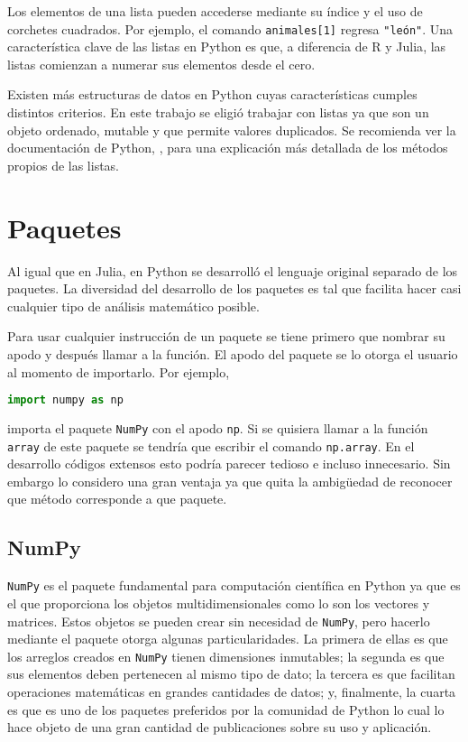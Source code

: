 Los elementos de una lista pueden accederse mediante su índice y el uso de corchetes cuadrados. Por ejemplo, el comando \texttt{animales[1]} regresa \texttt{"león"}. Una característica clave de las listas en \textsf{Python} es que, a diferencia de \textsf{R} y \textsf{Julia}, las listas comienzan a numerar sus elementos desde el cero. 

Existen más estructuras de datos en \textsf{Python} cuyas características cumples distintos criterios. En este trabajo se eligió trabajar con listas ya que son un objeto ordenado, mutable y que permite valores duplicados. Se recomienda ver la documentación de \textsf{Python}, \cite{doc_python}, para una explicación más detallada de los métodos propios de las listas. 

\section{Paquetes}
Al igual que en \textsf{Julia}, en \textsf{Python} se desarrolló el lenguaje original separado de los paquetes. La diversidad del desarrollo de los paquetes es tal que facilita hacer casi cualquier tipo de análisis matemático posible. 

Para usar cualquier instrucción de un paquete se tiene primero que nombrar su apodo y después llamar a la función. El apodo del paquete se lo otorga el usuario al momento de importarlo. Por ejemplo, 
\begin{lstlisting}[language=Python]
	import numpy as np
\end{lstlisting}

\noindent importa el paquete \texttt{NumPy} con el apodo \texttt{np}. Si se quisiera llamar a la función \texttt{array} de este paquete se tendría que escribir el comando \texttt{np.array}. En el desarrollo códigos extensos esto podría parecer tedioso e incluso innecesario. Sin embargo lo considero una gran ventaja ya que quita la ambigüedad de reconocer que método corresponde a que paquete.

\subsection{NumPy} \label{seccion_numpy}
\texttt{NumPy} es el paquete fundamental para computación científica en \textsf{Python} ya que es el que proporciona los objetos multidimensionales como lo son los vectores y matrices. Estos objetos se pueden crear sin necesidad de \texttt{NumPy}, pero hacerlo mediante el paquete otorga algunas particularidades. La primera de ellas es que los arreglos creados en \texttt{NumPy} tienen dimensiones inmutables; la segunda es que sus elementos deben pertenecen al mismo tipo de dato; la tercera es que facilitan operaciones matemáticas en grandes cantidades de datos; y, finalmente, la cuarta es que es uno de los paquetes preferidos por la comunidad de \textsf{Python} lo cual lo hace objeto de una gran cantidad de publicaciones sobre su uso y aplicación. 

